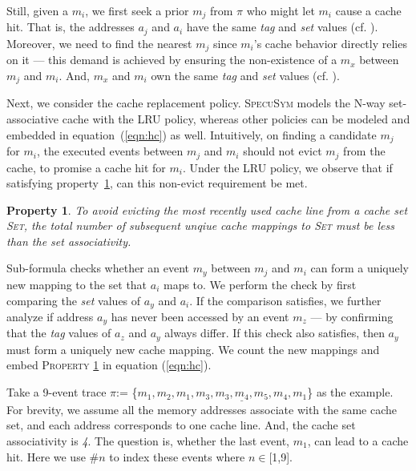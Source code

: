 \documentclass[sigconf]{acmart}
\newcommand*\circled[1]{\tikz[baseline=(char.base)]{
				\node[shape=circle,draw,inner sep=1pt] (char) {\scriptsize{#1}};}}
\newcommand{\SpecuSym}{\textsc{SpecuSym} }
\newtheorem{pro}{Property}
\begin{document}
Still, given a $\mathit{m_i}$, we first seek a prior $\mathit{m_j}$ 
from $\pi$ who might let $\mathit{m_i}$ cause a cache hit. That is, the 
addresses $\mathit{a_j}$ and $\mathit{a_i}$ have the same \emph{tag} 
and \emph{set} values (cf. \circled{4}). Moreover, we need to find the 
nearest $\mathit{m_j}$ since $\mathit{m_i}$'s cache behavior directly 
relies on it --- this demand is achieved by ensuring the non-existence 
of a $\mathit{m_x}$ between $\mathit{m_j}$ and $\mathit{m_i}$. And, 
$\mathit{m_x}$ and $\mathit{m_i}$ own the same \textit{tag} and 
\textit{set} values (cf. \circled{5}).


Next, we consider the cache replacement policy. \SpecuSym models the N-way 
set-associative cache with the LRU policy, whereas other policies can be 
modeled and embedded in equation~(\ref{eqn:hc}) as well. Intuitively, on 
finding a candidate $\mathit{m_j}$ for $\mathit{m_i}$, the executed events 
between $\mathit{m_j}$ and $\mathit{m_i}$ should not evict $\mathit{m_j}$ 
from the cache, to promise a cache hit for $\mathit{m_i}$. Under the LRU 
policy, we observe that if satisfying property~\ref{pro:p1}, can this 
non-evict requirement be met.
%
\begin{pro}
  \label{pro:p1}
  To avoid evicting the most recently used cache line from a cache set 
  \textsc{Set}, the total number of subsequent unqiue cache mappings to 
  \textsc{Set} must be less than the set associativity.
\end{pro}
%
Sub-formula \circled{6} checks whether an event $\mathit{m_y}$ between 
$\mathit{m_j}$ and $\mathit{m_i}$ can form a uniquely new mapping to the 
set that $\mathit{a_i}$ maps to. We perform the check by first comparing 
the \textit{set} values of $\mathit{a_y}$ and $\mathit{a_i}$. If the 
comparison satisfies, we further analyze if address $\mathit{a_y}$ has 
never been accessed by an event $\mathit{m_z}$ --- by confirming that the 
\emph{tag} values of $\mathit{a_z}$ and $\mathit{a_y}$ always differ. If 
this check also satisfies, then $\mathit{a_y}$ must form a uniquely new 
cache mapping. We count the new mappings and embed \textsc{Property}
\ref{pro:p1} in equation (\ref{eqn:hc}).


Take a 9-event trace $\pi$:=
\{$\mathit{m_1,m_2,\underline{m_1,m_3,m_3,m_4,m_5,m_4,m_1}}$\} as the 
example. For brevity, we assume all the memory addresses associate with 
the same cache set, and each address corresponds to one cache line. And, 
the cache set associativity is \textit{4}. The question is, whether the 
last event, $\mathit{m_1}$, can lead to a cache hit. Here we use 
\#$n$ to index these events where $n\in$[1,9].
\end{document}
